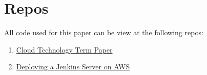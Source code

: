 \section{Repos} \label{repos}

All code used for this paper can be view at the following repos:
\begin{enumerate}
	\item \href{https://github.com/robshelly/cloud-technology-term-paper}{Cloud Technology Term Paper}
	\item \href{https://github.com/robshelly/cloud-technology-term-paper}{Deploying a Jenkins Server on AWS}
\end{enumerate}


